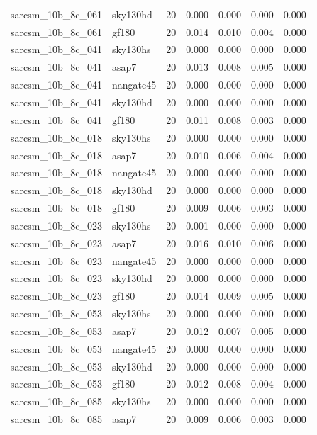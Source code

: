 \begin{tabular}{llrrrrr}
sarcsm\_10b\_8c\_061 & sky130hd & 20 & 0.000 & 0.000 & 0.000 & 0.000 \\
sarcsm\_10b\_8c\_061 & gf180 & 20 & 0.014 & 0.010 & 0.004 & 0.000 \\
sarcsm\_10b\_8c\_041 & sky130hs & 20 & 0.000 & 0.000 & 0.000 & 0.000 \\
sarcsm\_10b\_8c\_041 & asap7 & 20 & 0.013 & 0.008 & 0.005 & 0.000 \\
sarcsm\_10b\_8c\_041 & nangate45 & 20 & 0.000 & 0.000 & 0.000 & 0.000 \\
sarcsm\_10b\_8c\_041 & sky130hd & 20 & 0.000 & 0.000 & 0.000 & 0.000 \\
sarcsm\_10b\_8c\_041 & gf180 & 20 & 0.011 & 0.008 & 0.003 & 0.000 \\
sarcsm\_10b\_8c\_018 & sky130hs & 20 & 0.000 & 0.000 & 0.000 & 0.000 \\
sarcsm\_10b\_8c\_018 & asap7 & 20 & 0.010 & 0.006 & 0.004 & 0.000 \\
sarcsm\_10b\_8c\_018 & nangate45 & 20 & 0.000 & 0.000 & 0.000 & 0.000 \\
sarcsm\_10b\_8c\_018 & sky130hd & 20 & 0.000 & 0.000 & 0.000 & 0.000 \\
sarcsm\_10b\_8c\_018 & gf180 & 20 & 0.009 & 0.006 & 0.003 & 0.000 \\
sarcsm\_10b\_8c\_023 & sky130hs & 20 & 0.001 & 0.000 & 0.000 & 0.000 \\
sarcsm\_10b\_8c\_023 & asap7 & 20 & 0.016 & 0.010 & 0.006 & 0.000 \\
sarcsm\_10b\_8c\_023 & nangate45 & 20 & 0.000 & 0.000 & 0.000 & 0.000 \\
sarcsm\_10b\_8c\_023 & sky130hd & 20 & 0.000 & 0.000 & 0.000 & 0.000 \\
sarcsm\_10b\_8c\_023 & gf180 & 20 & 0.014 & 0.009 & 0.005 & 0.000 \\
sarcsm\_10b\_8c\_053 & sky130hs & 20 & 0.000 & 0.000 & 0.000 & 0.000 \\
sarcsm\_10b\_8c\_053 & asap7 & 20 & 0.012 & 0.007 & 0.005 & 0.000 \\
sarcsm\_10b\_8c\_053 & nangate45 & 20 & 0.000 & 0.000 & 0.000 & 0.000 \\
sarcsm\_10b\_8c\_053 & sky130hd & 20 & 0.000 & 0.000 & 0.000 & 0.000 \\
sarcsm\_10b\_8c\_053 & gf180 & 20 & 0.012 & 0.008 & 0.004 & 0.000 \\
sarcsm\_10b\_8c\_085 & sky130hs & 20 & 0.000 & 0.000 & 0.000 & 0.000 \\
sarcsm\_10b\_8c\_085 & asap7 & 20 & 0.009 & 0.006 & 0.003 & 0.000 \\

\end{tabular}
